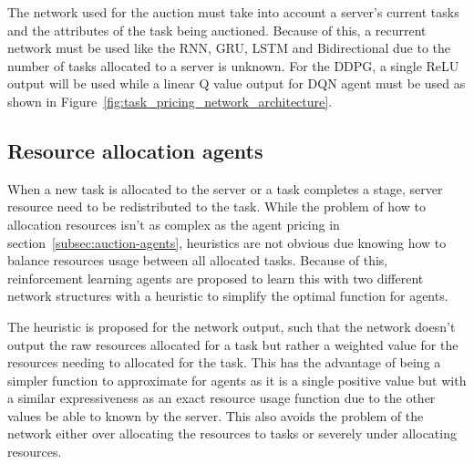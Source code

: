 The network used for the auction must take into account a server's current tasks and the attributes of the task being
auctioned. Because of this, a recurrent network must be used like the RNN, GRU, LSTM and Bidirectional due to the number
of tasks allocated to a server is unknown. For the DDPG, a single ReLU output will be used while a linear Q value output
for DQN agent must be used as shown in Figure~\ref{fig:task_pricing_network_architecture}.

\subsection{Resource allocation agents}
\label{subsec:resource-allocation-agents}
When a new task is allocated to the server or a task completes a stage, server resource need to be redistributed
to the task. While the problem of how to allocation resources isn't as complex as the agent pricing in
section~\ref{subsec:auction-agents}, heuristics are not obvious due knowing how to balance resources usage
between all allocated tasks. Because of this, reinforcement learning agents are proposed to learn this with two
different network structures with a heuristic to simplify the optimal function for agents.

The heuristic is proposed for the network output, such that the network doesn't output the raw
resources allocated for a task but rather a weighted value for the resources needing to allocated for the task.
This has the advantage of being a simpler function to approximate for agents as it is a single positive value but with a
similar expressiveness as an exact resource usage function due to the other values be able to known by the server. This
also avoids the problem of the network either over allocating the resources to tasks or severely under allocating
resources.

